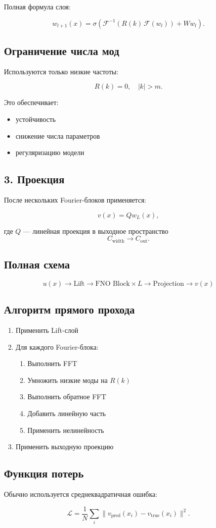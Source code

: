 Полная формула слоя:

\[
w_{l+1}(x) =
\sigma\left(
\mathcal{F}^{-1} \left(
R(k)\,\mathcal{F}(w_l)
\right)
+
W w_l
\right).
\]

\subsection{Ограничение числа мод}

Используются только низкие частоты:

\[
R(k) = 0, \quad |k| > m.
\]

Это обеспечивает:

\begin{itemize}
    \item устойчивость
    \item снижение числа параметров
    \item регуляризацию модели
\end{itemize}

\subsection{3. Проекция}

После нескольких Fourier-блоков применяется:

\[
v(x) = Q w_L(x),
\]

где $Q$ — линейная проекция в выходное пространство
\[
C_{\text{width}} \rightarrow C_{\text{out}}.
\]

\subsection{Полная схема}

\[
u(x)
\rightarrow
\text{Lift}
\rightarrow
\text{FNO Block} \times L
\rightarrow
\text{Projection}
\rightarrow
v(x)
\]

\subsection{Алгоритм прямого прохода}

\begin{enumerate}
    \item Применить Lift-слой
    \item Для каждого Fourier-блока:
    \begin{enumerate}
        \item Выполнить FFT
        \item Умножить низкие моды на $R(k)$
        \item Выполнить обратное FFT
        \item Добавить линейную часть
        \item Применить нелинейность
    \end{enumerate}
    \item Применить выходную проекцию
\end{enumerate}

\subsection{Функция потерь}

Обычно используется среднеквадратичная ошибка:

\[
\mathcal{L}
=
\frac{1}{N}
\sum_i
\| v_{\text{pred}}(x_i) - v_{\text{true}}(x_i) \|^2.
\]
